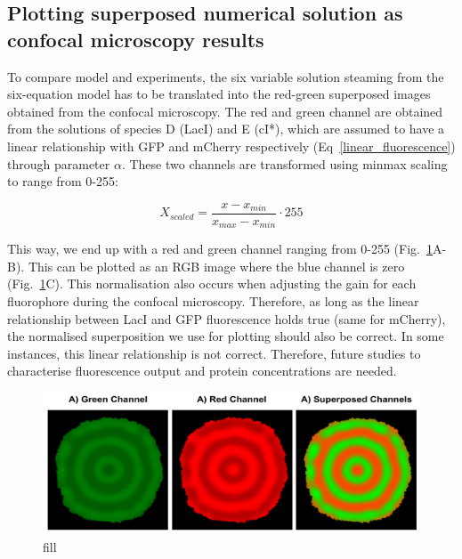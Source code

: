 \subsection{Plotting superposed numerical solution as confocal microscopy results}\label{Plotting superposed numerical solution as confocal microscopy results}
To compare model and experiments, the six variable solution steaming from the six-equation model has to be translated into the red-green superposed images obtained from the confocal microscopy.
The red and green channel are obtained from the solutions of species D (LacI) and E (cI*), which are assumed to have a linear relationship with GFP and mCherry respectively (Eq~\ref{linear_fluorescence}) through parameter $\alpha$.
These two channels are transformed using minmax scaling to range from 0-255:

\begin{equation}
    X_{scaled} = \frac{x-x_{min}}{x_{max}-x_{min}} \cdot 255
\end{equation}

This way, we end up with a red and green channel ranging from 0-255 (Fig.~\ref{redgreesupersposed}A-B).
This can be plotted as an RGB image where the blue channel is zero (Fig.~\ref{redgreesupersposed}C).
This normalisation also occurs when adjusting the gain for each fluorophore during the confocal microscopy.
Therefore, as long as the linear relationship between LacI and GFP fluorescence holds true (same for mCherry), the normalised superposition we use for plotting should also be correct.
In some instances, this linear relationship is not correct.
Therefore, future studies to characterise fluorescence output and protein concentrations are needed.


\begin{figure}[H]

    \includegraphics[width=1\textwidth]{chapters/Methods/redgreesupersposed}
    \caption{fill}
    \label{redgreesupersposed}
\end{figure}

